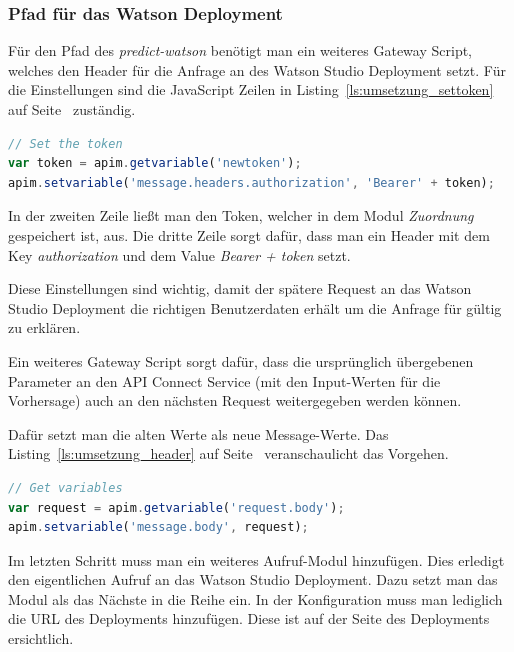 \subsubsection*{Pfad für das Watson Deployment}
Für den Pfad des \textit{predict-watson} benötigt man ein weiteres Gateway Script, welches den Header für die Anfrage
an des Watson Studio Deployment setzt. Für die Einstellungen sind die JavaScript Zeilen in
Listing~\ref{ls:umsetzung_settoken} auf Seite~\pageref{ls:umsetzung_settoken} zuständig.

\begin{lstlisting}[language=JavaScript, caption=Gateway Script für den Authorization-Token, label=ls:umsetzung_settoken]
// Set the token
var token = apim.getvariable('newtoken');
apim.setvariable('message.headers.authorization', 'Bearer' + token);
\end{lstlisting}

In der zweiten Zeile ließt man den Token, welcher in dem Modul \textit{Zuordnung} gespeichert ist, aus. Die dritte
Zeile sorgt dafür, dass man ein Header mit dem Key \textit{authorization} und dem Value \textit{Bearer + token} setzt.

Diese Einstellungen sind wichtig, damit der spätere Request an das Watson Studio Deployment die richtigen Benutzerdaten
erhält um die Anfrage für gültig zu erklären.

Ein weiteres Gateway Script sorgt dafür, dass die ursprünglich übergebenen Parameter an den API Connect Service (mit den
Input-Werten für die Vorhersage) auch an den nächsten Request weitergegeben werden können.

Dafür setzt man die alten Werte als neue Message-Werte. Das Listing~\ref{ls:umsetzung_header} auf
Seite~\pageref{ls:umsetzung_header} veranschaulicht das Vorgehen.

\begin{lstlisting}[language=JavaScript, caption=Gateway Script zum Setzen des Message-Bodyies, label=ls:umsetzung_header]
// Get variables
var request = apim.getvariable('request.body');
apim.setvariable('message.body', request);
\end{lstlisting}

Im letzten Schritt muss man ein weiteres Aufruf-Modul hinzufügen. Dies erledigt den eigentlichen Aufruf an das Watson
Studio Deployment. Dazu setzt man das Modul als das Nächste in die Reihe ein. In der Konfiguration muss man lediglich
die URL des Deployments hinzufügen. Diese ist auf der Seite des Deployments ersichtlich.

